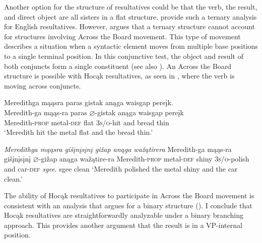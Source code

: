 \documentclass[output=paper]{LSP/langsci}
\begin{document}
Another option for the structure of resultatives could be that the verb, the result, and direct object are all sisters in a flat structure.  \citet{Carrier1992} provide such a ternary analysis for English resultatives. However, \citet{Bowers1997} argues that a ternary structure cannot account for structures involving Across the Board movement. This type of movement describes a situation when a syntactic element moves from multiple base positions to a single terminal position. In this conjunctive test, the object and result of both conjuncts form a single constituent (see also \citealt{Li1999}). An Across the Board structure is possible with Hocąk resultatives, as seen in , where the verb is moving across conjuncts.

\begin{exe}
\ex\label{ex:rosen:26}
\begin{xlist}

\ex \glll Meredithga mąąsra paras gistak anąga waisgap pereįk. \\
Meredith-ga mąąs-ra paras {$\varnothing$}-gistak anąga waisgap pereįk\\
Meredith-\textsc{prop} metal-\textsc{def} flat \textsc{3s/o}-hit and bread thin\\
\glt `Meredith hit the metal flat and the bread thin.'

\ex \textit{Meredithga \hspace{1.58em} mąąsra \hspace{.9em} gišįnį{s}įnį \hspace{.1em}gižap  \hspace {2.4em} anąga wažątirera}  \newline Meredith-ga \hspace{1.18em} mąąs-ra \hspace {.5em} gišįnį{s}įnį {$\varnothing$}-gižap \hspace{1.3em} anąga wažątire-ra \newline Meredith-\textsc{prop} metal-\textsc{def} shiny \hspace{1.6em} \textsc{3s/o}-polish and \hspace{1em} car-\textsc{def} \newline\textit{sgee}. \newline
sgee \newline
clean \newline
`Meredith polished the metal shiny and the car clean.'

\end{xlist}
\end{exe}
 
The ability of Hocąk resultatives to participate in Across the Board movement is consistent with an analysis that argues for a binary structure (\citealt{Bowers1997}). I conclude that Hocąk resultatives are straightforwardly analyzable under a binary branching approach. This provides another argument that the result is in a VP-internal position.
 
\end{document}
